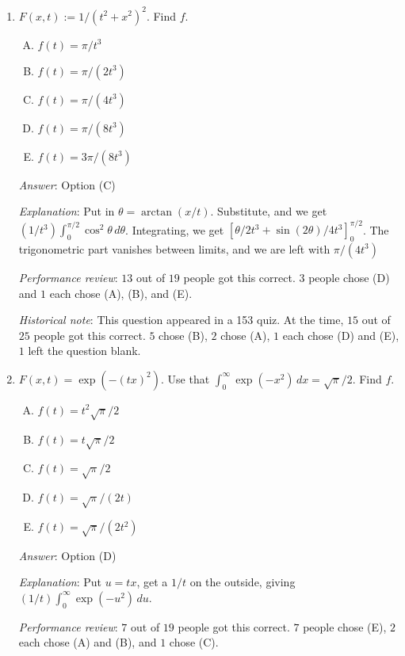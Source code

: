 \documentclass[10pt]{amsart}
\begin{document}
\begin{enumerate}
  {\em Historical note}: This question appeared in a 153 quiz. At the
  time, $17$ out of $25$ got this correct. $5$ chose (B), $2$ chose
  (D), $1$ chose (C).

\item $F(x,t) := 1/(t^2 + x^2)^2$. Find $f$.

  \begin{enumerate}[(A)]
  \item $f(t) = \pi/t^3$
  \item $f(t) = \pi/(2t^3)$
  \item $f(t) = \pi/(4t^3)$
  \item $f(t) = \pi/(8t^3)$
  \item $f(t) = 3\pi/(8t^3)$
  \end{enumerate}

  {\em Answer}: Option (C)

  {\em Explanation}: Put in $\theta = \arctan(x/t)$. Substitute, and
  we get $(1/t^3) \int_0^{\pi/2} \cos^2\theta \,
  d\theta$. Integrating, we get $[\theta/2t^3 +
  \sin(2\theta)/4t^3]_0^{\pi/2}$. The trigonometric part vanishes
  between limits, and we are left with $\pi/(4t^3)$

  {\em Performance review}: $13$ out of $19$ people got this
  correct. $3$ people chose (D) and $1$ each chose (A), (B), and (E).

  {\em Historical note}: This question appeared in a 153 quiz. At the
  time, $15$ out of $25$ people got this correct. $5$ chose (B), $2$
  chose (A), $1$ each chose (D) and (E), $1$ left the question blank.

\item $F(x,t) = \exp(-(tx)^2)$. Use that $\int_0^\infty \exp(-x^2) \, dx=
  \sqrt{\pi}/2$. Find $f$.

  \begin{enumerate}[(A)]
  \item $f(t) = t^2\sqrt{\pi}/2$
  \item $f(t) = t\sqrt{\pi}/2$
  \item $f(t) = \sqrt{\pi}/2$
  \item $f(t) = \sqrt{\pi}/(2t)$
  \item $f(t) = \sqrt{\pi}/(2t^2)$
  \end{enumerate}

  {\em Answer}: Option (D)

  {\em Explanation}: Put $u = tx$, get a $1/t$ on the outside, giving
  $(1/t) \int_0^\infty \exp(-u^2) \, du$.

  {\em Performance review}: $7$ out of $19$ people got this
  correct. $7$ people chose (E), $2$ each chose (A) and (B), and $1$
  chose (C).


\end{enumerate}
\end{document}

